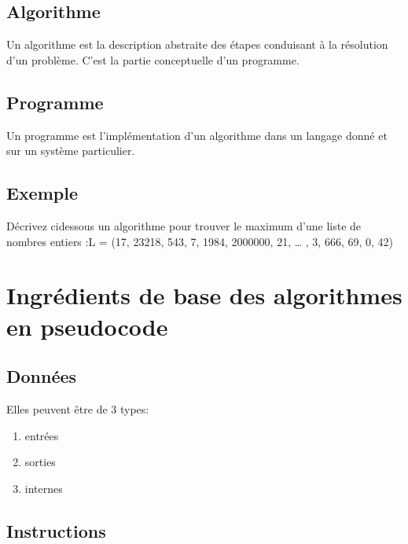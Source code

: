 \documentclass[letterpaper,10pt,english]{sphinxmanual}
\begin{document}
\subsection{Algorithme}
\label{\detokenize{src/OCI_HS1_Algorithmes:algorithme}}
Un algorithme est la description abstraite des étapes  conduisant à la résolution d’un problème. C’est la partie conceptuelle d’un programme.


\subsection{Programme}
\label{\detokenize{src/OCI_HS1_Algorithmes:programme}}
Un programme est l’implémentation d’un algorithme dans un langage donné et sur un système particulier.


\subsection{Exemple}
\label{\detokenize{src/OCI_HS1_Algorithmes:exemple}}
Décrivez ci\sphinxhyphen{}dessous un algorithme pour trouver le maximum d’une  liste de nombres entiers :L = (17, 23218, 543, 7, 1984, 2000000, 21, … , 3, 666, 69, 0, 42)



\section{Ingrédients de base des algorithmes en pseudo\sphinxhyphen{}code}
\label{\detokenize{src/OCI_HS1_Algorithmes:ingredients-de-base-des-algorithmes-en-pseudo-code}}

\subsection{Données}
\label{\detokenize{src/OCI_HS1_Algorithmes:donnees}}
Elles peuvent être de 3 types:
\begin{enumerate}
%
\item {} 
entrées

\item {} 
sorties

\item {} 
internes

\end{enumerate}


\subsection{Instructions}
\label{\detokenize{src/OCI_HS1_Algorithmes:instructions}}
\end{document}
